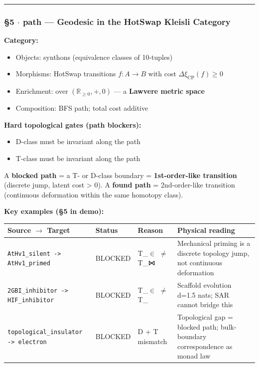 \documentclass[12pt,a4paper]{article}
\begin{document}
\begin{center}
\rule{0.5\textwidth}{0.4pt}
\end{center}

\subsubsection{§5 $\cdot$ path --- Geodesic in the HotSwap Kleisli Category}

\textbf{Category:}

\begin{itemize}
    \item Objects: synthons (equivalence classes of 10-tuples)
    \item Morphisms: HotSwap transitions $f: A \to B$ with cost $\Delta\xi_\text{CP}(f) \geq 0$
    \item Enrichment: over $(\mathbb{R}_{\geq 0}, +, 0)$ --- a \textbf{Lawvere metric space}
    \item Composition: BFS path; total cost additive
\end{itemize}

\textbf{Hard topological gates (path blockers):}

\begin{itemize}
    \item D-class must be invariant along the path
    \item T-class must be invariant along the path
\end{itemize}

A \textbf{blocked path} = a T- or D-class boundary = \textbf{1st-order-like transition} (discrete jump, latent cost \textgreater{} 0). A \textbf{found path} = 2nd-order-like transition (continuous deformation within the same homotopy class).

\textbf{Key examples (§5 in demo):}

\begin{table}[htbp]
\centering
\small
{}
\begin{tabularx}{\textwidth}{>{\centering\arraybackslash}X >{\centering\arraybackslash}X >{\centering\arraybackslash}X >{\centering\arraybackslash}X}
\toprule
\rowcolor{gray!25}\textbf{Source $\rightarrow$ Target} & \textbf{Status} & \textbf{Reason} & \textbf{Physical reading} \\
\midrule
\rowcolors{1}{white}{gray!10}
\texttt{AtHv1\_silent -\textgreater{} AtHv1\_primed} & BLOCKED & T\_$\in$ $\neq$ T\_⋈ & Mechanical priming is a discrete topology jump, not continuous deformation \\
\texttt{2GBI\_inhibitor -\textgreater{} HIF\_inhibitor} & BLOCKED & T\_$\in$ $\neq$ T\_\textbar{} & Scaffold evolution d=1.5 nats; SAR cannot bridge this \\
\texttt{topological\_insulator -\textgreater{} electron} & BLOCKED & D + T mismatch & Topological gap = blocked path; bulk-boundary correspondence as monad law \\
\bottomrule
\end{tabularx}
\end{table}
\end{document}
